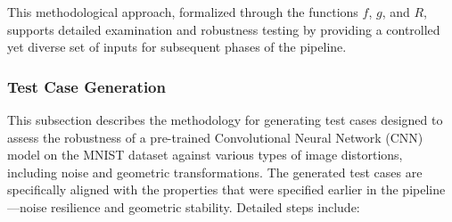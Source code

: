 \documentclass[10pt, conference, a4paper, final]{IEEEtran}
\begin{document}
This methodological approach, formalized through the functions \( f \), \( g \), and \( R \), supports detailed examination and robustness testing by providing a controlled yet diverse set of inputs for subsequent phases of the pipeline.


\subsubsection{Test Case Generation}
This subsection describes the methodology for generating test cases designed to assess the robustness of a pre-trained Convolutional Neural Network (CNN) model on the MNIST dataset against various types of image distortions, including noise and geometric transformations. The generated test cases are specifically aligned with the properties that were specified earlier in the pipeline—noise resilience and geometric stability. Detailed steps include:
\end{document}
